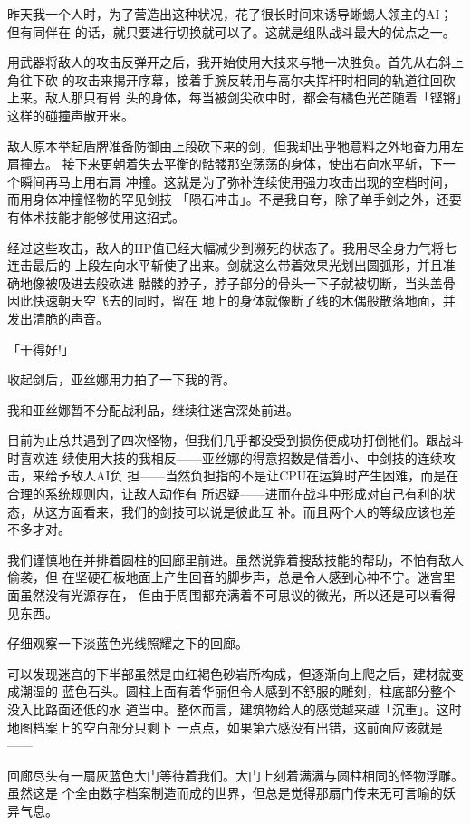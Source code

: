 \documentclass[11pt]{book}
\begin{document}
昨天我一个人时，为了营造出这种状况，花了很长时间来诱导蜥蜴人领主的AI；但有同伴在
的话，就只要进行切换就可以了。这就是组队战斗最大的优点之一。

用武器将敌人的攻击反弹开之后，我开始使用大技来与牠一决胜负。首先从右斜上角往下砍
的攻击来揭开序幕，接着手腕反转用与高尔夫挥杆时相同的轨道往回砍上来。敌人那只有骨
头的身体，每当被剑尖砍中时，都会有橘色光芒随着「铿锵」这样的碰撞声散开来。

敌人原本举起盾牌准备防御由上段砍下来的剑，但我却出乎牠意料之外地奋力用左肩撞去。
接下来更朝着失去平衡的骷髅那空荡荡的身体，使出右向水平斩，下一个瞬间再马上用右肩
冲撞。这就是为了弥补连续使用强力攻击出现的空档时间，而用身体冲撞怪物的罕见剑技
「陨石冲击」。不是我自夸，除了单手剑之外，还要有体术技能才能够使用这招式。

经过这些攻击，敌人的HP值已经大幅减少到濒死的状态了。我用尽全身力气将七连击最后的
上段左向水平斩使了出来。剑就这么带着效果光划出圆弧形，并且准确地像被吸进去般砍进
骷髅的脖子，脖子部分的骨头一下子就被切断，当头盖骨因此快速朝天空飞去的同时，留在
地上的身体就像断了线的木偶般散落地面，并发出清脆的声音。

「干得好!」

收起剑后，亚丝娜用力拍了一下我的背。

我和亚丝娜暂不分配战利品，继续往迷宫深处前进。

目前为止总共遇到了四次怪物，但我们几乎都没受到损伤便成功打倒牠们。跟战斗时喜欢连
续使用大技的我相反——亚丝娜的得意招数是借着小、中剑技的连续攻击，来给予敌人AI负
担——当然负担指的不是让CPU在运算时产生困难，而是在合理的系统规则内，让敌人动作有
所迟疑——进而在战斗中形成对自己有利的状态，从这方面看来，我们的剑技可以说是彼此互
补。而且两个人的等级应该也差不多才对。

我们谨慎地在并排着圆柱的回廊里前进。虽然说靠着搜敌技能的帮助，不怕有敌人偷袭，但
在坚硬石板地面上产生回音的脚步声，总是令人感到心神不宁。迷宫里面虽然没有光源存在，
但由于周围都充满着不可思议的微光，所以还是可以看得见东西。

仔细观察一下淡蓝色光线照耀之下的回廊。

可以发现迷宫的下半部虽然是由红褐色砂岩所构成，但逐渐向上爬之后，建材就变成潮湿的
蓝色石头。圆柱上面有着华丽但令人感到不舒服的雕刻，柱底部分整个没入比路面还低的水
道当中。整体而言，建筑物给人的感觉越来越「沉重」。这时地图档案上的空白部分只剩下
一点点，如果第六感没有出错，这前面应该就是——

回廊尽头有一扇灰蓝色大门等待着我们。大门上刻着满满与圆柱相同的怪物浮雕。虽然这是
个全由数字档案制造而成的世界，但总是觉得那扇门传来无可言喻的妖异气息。
\end{document}

